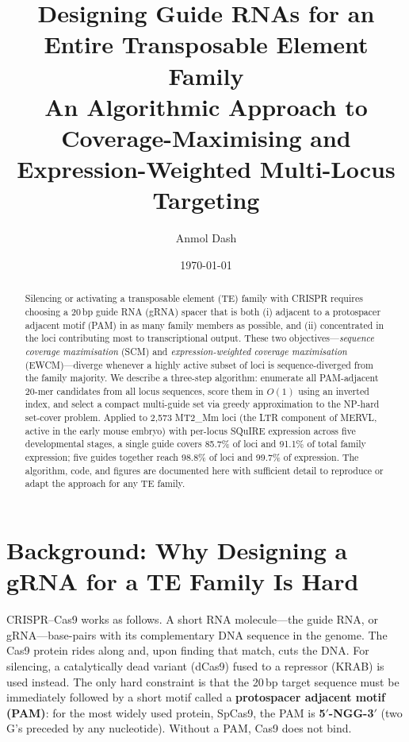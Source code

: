 \documentclass[11pt]{article}
\title{\textbf{Designing Guide RNAs for an Entire Transposable Element Family}\\[4pt]
{\large An Algorithmic Approach to Coverage-Maximising and\\
Expression-Weighted Multi-Locus Targeting}}
\author{Anmol Dash}
\date{\today}
\begin{document}
\maketitle

\begin{abstract}
\noindent
Silencing or activating a transposable element (TE) family with CRISPR requires choosing a
20\,bp guide RNA (gRNA) spacer that is both (i) adjacent to a protospacer adjacent motif
(PAM) in as many family members as possible, and (ii) concentrated in the loci contributing
most to transcriptional output.  These two objectives---\emph{sequence coverage maximisation}
(SCM) and \emph{expression-weighted coverage maximisation} (EWCM)---diverge whenever a
highly active subset of loci is sequence-diverged from the family majority.  We describe a
three-step algorithm: enumerate all PAM-adjacent 20-mer candidates from all locus sequences,
score them in $O(1)$ using an inverted index, and select a compact multi-guide set via
greedy approximation to the NP-hard set-cover problem.  Applied to 2,573 MT2\_Mm loci
(the LTR component of MERVL, active in the early mouse embryo) with per-locus SQuIRE
expression across five developmental stages, a single guide covers 85.7\% of loci and
91.1\% of total family expression; five guides together reach 98.8\% of loci and 99.7\%
of expression.  The algorithm, code, and figures are documented here with sufficient detail
to reproduce or adapt the approach for any TE family.
\end{abstract}

\section{Background: Why Designing a gRNA for a TE Family Is Hard}

CRISPR--Cas9 works as follows.  A short RNA molecule---the guide RNA, or gRNA---base-pairs
with its complementary DNA sequence in the genome.  The Cas9 protein rides along and, upon
finding that match, cuts the DNA.  For silencing, a catalytically dead variant (dCas9) fused
to a repressor (KRAB) is used instead.  The only hard constraint is that the 20\,bp target
sequence must be immediately followed by a short motif called a \textbf{protospacer adjacent
motif (PAM)}: for the most widely used protein, SpCas9, the PAM is
\textbf{5$'$-NGG-3$'$} (two G's preceded by any nucleotide).  Without a PAM, Cas9 does not
bind.
\end{document}
